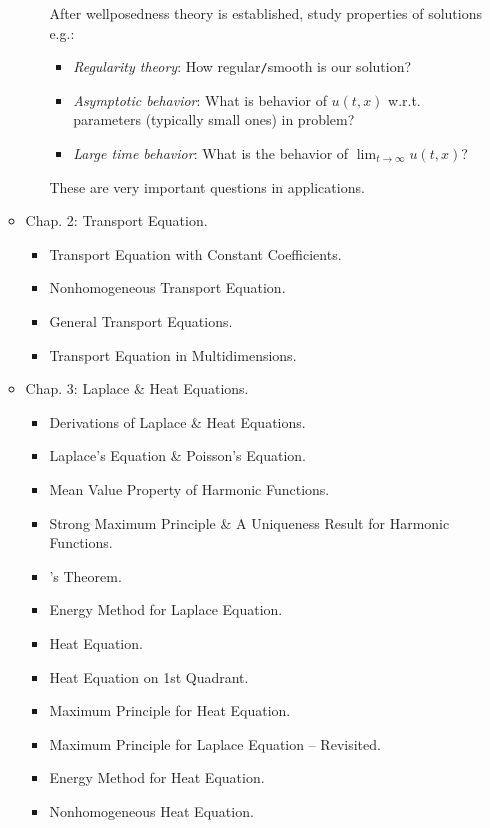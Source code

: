 \documentclass{article}
\begin{document}
\begin{enumerate}
\begin{itemize}
\begin{itemize}
			After wellposedness theory is established, study properties of solutions e.g.:
			\begin{itemize}
				\item {\it Regularity theory}: How regular{\tt/}smooth is our solution?
				\item {\it Asymptotic behavior}: What is behavior of $u(t,x)$ w.r.t. parameters (typically small ones) in problem?
				\item {\it Large time behavior}: What is the behavior of $\lim_{t\to\infty} u(t,x)$?
			\end{itemize}
			These are very important questions in applications.
		\end{itemize}
		\item {\sf Chap. 2: Transport Equation.}
		\begin{itemize}
			\item {\sf Transport Equation with Constant Coefficients.}
			\item {\sf Nonhomogeneous Transport Equation.}
			\item {\sf General Transport Equations.}
			\item {\sf Transport Equation in Multidimensions.}
		\end{itemize}
		\item {\sf Chap. 3: Laplace \& Heat Equations.}
		\begin{itemize}
			\item {\sf Derivations of Laplace \& Heat Equations.}
			\item {\sf Laplace's Equation \& Poisson's Equation.}
			\item {\sf Mean Value Property of Harmonic Functions.}
			\item {\sf Strong Maximum Principle \& A Uniqueness Result for Harmonic Functions.}
			\item {'s Theorem.}
			\item {\sf Energy Method for Laplace Equation.}
			\item {\sf Heat Equation.}
			\item {\sf Heat Equation on 1st Quadrant.}
			\item {\sf Maximum Principle for Heat Equation.}
			\item {\sf Maximum Principle for Laplace Equation -- Revisited.}
			\item {\sf Energy Method for Heat Equation.}
			\item {\sf Nonhomogeneous Heat Equation.}
		\end{itemize}

\end{itemize}
\end{enumerate}
\end{document}

